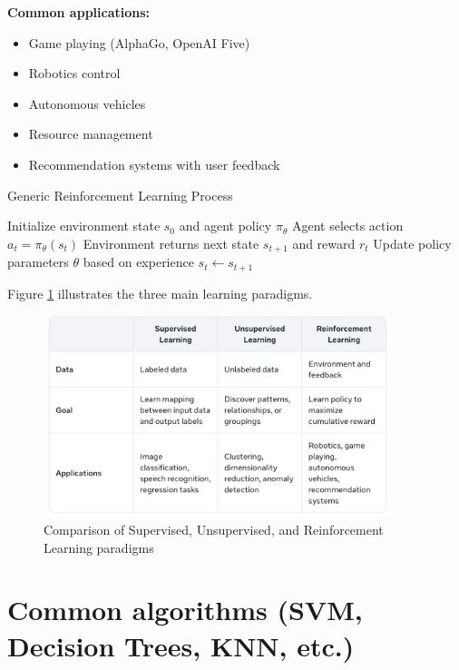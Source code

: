 \documentclass[11pt,a4paper]{report}
\begin{document}
\textbf{Common applications:}
\begin{itemize}
    \item Game playing (AlphaGo, OpenAI Five)
    \item Robotics control
    \item Autonomous vehicles
    \item Resource management
    \item Recommendation systems with user feedback
\end{itemize}

\begin{algorithm}
\caption{Generic Reinforcement Learning Process}
\begin{algorithmic}[1]
\STATE Initialize environment state $s_0$ and agent policy $\pi_\theta$
  \STATE Agent selects action $a_t = \pi_\theta(s_t)$
  \STATE Environment returns next state $s_{t+1}$ and reward $r_t$
  \STATE Update policy parameters $\theta$ based on experience
  \STATE $s_t \leftarrow s_{t+1}$
\ENDWHILE
\end{algorithmic}
\end{algorithm}

Figure \ref{fig:learning-paradigms} illustrates the three main learning paradigms.

\begin{figure}[ht]
    \centering
    \includegraphics[width=0.9\textwidth]{learning_paradigms_comparison.png}
    \caption{Comparison of Supervised, Unsupervised, and Reinforcement Learning paradigms}
    \label{fig:learning-paradigms}
\end{figure}

\section{Common algorithms (SVM, Decision Trees, KNN, etc.)}
\end{document}
